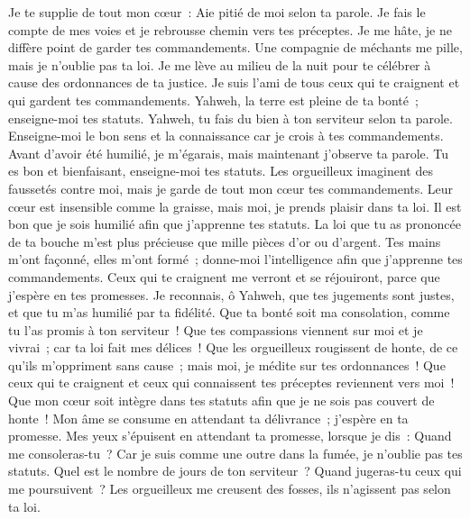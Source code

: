 \begin{multicols}{2}
Je te supplie de tout mon cœur~: Aie pitié de moi selon ta parole.
Je fais le compte de mes voies et je rebrousse chemin vers tes préceptes.
Je me hâte, je ne diffère point de garder tes commandements.
Une compagnie de méchants me pille, mais je n'oublie pas ta loi.
Je me lève au milieu de la nuit pour te célébrer à cause des ordonnances de ta justice.
Je suis l'ami de tous ceux qui te craignent et qui gardent tes commandements.
Yahweh, la terre est pleine de ta bonté~; enseigne-moi tes statuts.
 Yahweh, tu fais du bien à ton serviteur selon ta parole.
Enseigne-moi le bon sens et la connaissance car je crois à tes commandements.
Avant d'avoir été humilié, je m'égarais, mais maintenant j'observe ta parole.
Tu es bon et bienfaisant, enseigne-moi tes statuts.
Les orgueilleux imaginent des faussetés contre moi, mais je garde de tout mon cœur tes commandements.
Leur cœur est insensible comme la graisse, mais moi, je prends plaisir dans ta loi.
Il est bon que je sois humilié afin que j'apprenne tes statuts.
La loi que tu as prononcée de ta bouche m'est plus précieuse que mille pièces d'or ou d'argent.
 Tes mains m'ont façonné, elles m'ont formé~; donne-moi l'intelligence afin que j'apprenne tes commandements.
Ceux qui te craignent me verront et se réjouiront, parce que j'espère en tes promesses.
Je reconnais, ô Yahweh, que tes jugements sont justes, et que tu m'as humilié par ta fidélité.
Que ta bonté soit ma consolation, comme tu l'as promis à ton serviteur~!
Que tes compassions viennent sur moi et je vivrai~; car ta loi fait mes délices~!
Que les orgueilleux rougissent de honte, de ce qu'ils m'oppriment sans cause~; mais moi, je médite sur tes ordonnances~!
Que ceux qui te craignent et ceux qui connaissent tes préceptes reviennent vers moi~!
Que mon cœur soit intègre dans tes statuts afin que je ne sois pas couvert de honte~!
 Mon âme se consume en attendant ta délivrance~; j'espère en ta promesse.
Mes yeux s'épuisent en attendant ta promesse, lorsque je dis~: Quand me consoleras-tu~?
Car je suis comme une outre dans la fumée, je n'oublie pas tes statuts.
Quel est le nombre de jours de ton serviteur~? Quand jugeras-tu ceux qui me poursuivent~?
Les orgueilleux me creusent des fosses, ils n'agissent pas selon ta loi.

\end{multicols}
